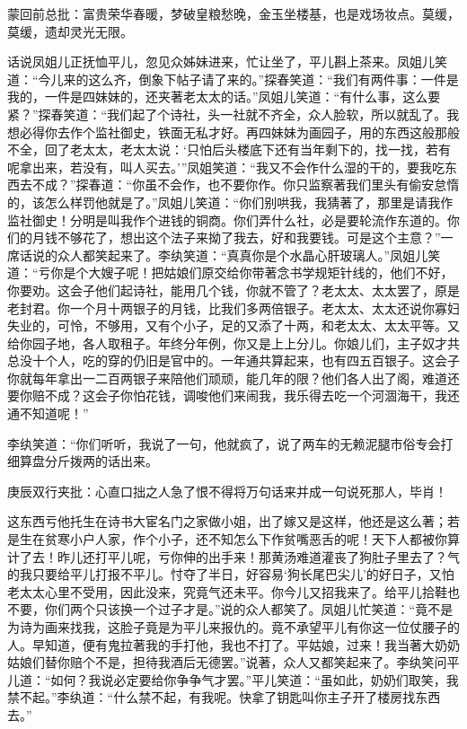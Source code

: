 \begin{parag}

    \begin{note}蒙回前总批：富贵荣华春暖，梦破皇粮愁晚，金玉坐楼基，也是戏场妆点。莫缓，莫缓，遗却灵光无限。\end{note}
\end{parag}

\begin{parag}

    话说凤姐儿正抚恤平儿，忽见众姊妹进来，忙让坐了，平儿斟上茶来。凤姐儿笑道：“今儿来的这么齐，倒象下帖子请了来的。”探春笑道：“我们有两件事：一件是我的，一件是四妹妹的，还夹著老太太的话。”凤姐儿笑道：“有什么事，这么要紧？”探春笑道：“我们起了个诗社，头一社就不齐全，众人脸软，所以就乱了。我想必得你去作个监社御史，铁面无私才好。再四妹妹为画园子，用的东西这般那般不全，回了老太太，老太太说：‘只怕后头楼底下还有当年剩下的，找一找，若有呢拿出来，若没有，叫人买去。’”凤姐笑道：“我又不会作什么湿的干的，要我吃东西去不成？”探春道：“你虽不会作，也不要你作。你只监察著我们里头有偷安怠惰的，该怎么样罚他就是了。”凤姐儿笑道：“你们别哄我，我猜著了，那里是请我作监社御史！分明是叫我作个进钱的铜商。你们弄什么社，必是要轮流作东道的。你们的月钱不够花了，想出这个法子来拗了我去，好和我要钱。可是这个主意？”一席话说的众人都笑起来了。李纨笑道：“真真你是个水晶心肝玻璃人。”凤姐儿笑道：“亏你是个大嫂子呢！把姑娘们原交给你带著念书学规矩针线的，他们不好，你要劝。这会子他们起诗社，能用几个钱，你就不管了？老太太、太太罢了，原是老封君。你一个月十两银子的月钱，比我们多两倍银子。老太太、太太还说你寡妇失业的，可怜，不够用，又有个小子，足的又添了十两，和老太太、太太平等。又给你园子地，各人取租子。年终分年例，你又是上上分儿。你娘儿们，主子奴才共总没十个人，吃的穿的仍旧是官中的。一年通共算起来，也有四五百银子。这会子你就每年拿出一二百两银子来陪他们顽顽，能几年的限？他们各人出了阁，难道还要你赔不成？这会子你怕花钱，调唆他们来闹我，我乐得去吃一个河涸海干，我还通不知道呢！”
\end{parag}


\begin{parag}


    李纨笑道：“你们听听，我说了一句，他就疯了，说了两车的无赖泥腿市俗专会打细算盘分斤拨两的话出来。\begin{note}庚辰双行夹批：心直口拙之人急了恨不得将万句话来并成一句说死那人，毕肖！\end{note}这东西亏他托生在诗书大宦名门之家做小姐，出了嫁又是这样，他还是这么著；若是生在贫寒小户人家，作个小子，还不知怎么下作贫嘴恶舌的呢！天下人都被你算计了去！昨儿还打平儿呢，亏你伸的出手来！那黄汤难道灌丧了狗肚子里去了？气的我只要给平儿打报不平儿。忖夺了半日，好容易‘狗长尾巴尖儿’的好日子，又怕老太太心里不受用，因此没来，究竟气还未平。你今儿又招我来了。给平儿拾鞋也不要，你们两个只该换一个过子才是。”说的众人都笑了。凤姐儿忙笑道：“竟不是为诗为画来找我，这脸子竟是为平儿来报仇的。竟不承望平儿有你这一位仗腰子的人。早知道，便有鬼拉著我的手打他，我也不打了。平姑娘，过来！我当著大奶奶姑娘们替你赔个不是，担待我酒后无德罢。”说著，众人又都笑起来了。李纨笑问平儿道：“如何？我说必定要给你争争气才罢。”平儿笑道：“虽如此，奶奶们取笑，我禁不起。”李纨道：“什么禁不起，有我呢。快拿了钥匙叫你主子开了楼房找东西去。”
\end{parag}



